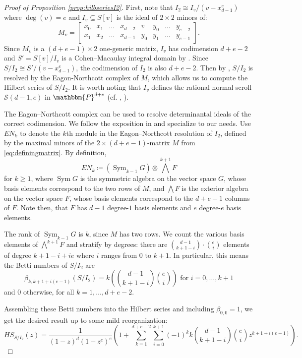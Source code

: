 \documentclass[12pt,reqno]{amsart}
\theoremstyle{definition}
\theoremstyle{remark}
\DeclareMathOperator{\Sym}{Sym}
\newcommand{\bbP}{\mathbbm{P}}
\newcommand{\calS}{{\mathcal{S}}}
\begin{document}
\begin{proof}[Proof of Proposition \ref{prop:hilbseriesI2}]
First, note that $I_2 \cong I_v/(v-x_{d-1}^e)$ where $\deg(v)=e$ and $I_v \subseteq S[v]$ is the ideal of $2 \times 2$ minors of:
$$
M_v = \begin{bmatrix}
x_0 & x_1 & \ldots & x_{d-2} & v & y_0 & \ldots & y_{e-2}\\
x_1 & x_2 & \ldots & x_{d-1} & y_0 & y_1 & \ldots & y_{e-1}
\end{bmatrix}.
$$
Since $M_v$ is a $(d+e-1) \times 2$ one-generic matrix, $I_v$ has codimension $d+e-2$ and $S' = S[v]/I_v$ is a Cohen--Macaulay integral domain by \cite[Theorem 6.4]{eGeomOSyz}.  Since $S/I_2 \cong S'/(v-x_{d-1}^e)$, the codimension of $I_2$ is also $d+e-2$.  Then by \cite[Theorem A2.60]{eGeomOSyz}, $S/I_2$ is resolved by the Eagon-Northcott complex of $M$, which allows us to compute the Hilbert series of $S/I_2$. It is worth noting that $I_v$ defines the rational normal scroll $\calS(d-1,e)$ in $\bbP^{d+e}$ (cf. \cite{ghPrinciplesAlgGeom}, \cite{ehVarietiesMinDeg}).

The Eagon--Northcott complex \cite{enIdDefBMatAACComplexAssocWThem} can be used to resolve determinantal ideals of the correct codimension. We follow the exposition in \cite[Appendix~A2H]{eGeomOSyz} and specialize to our needs. Use $EN_k$ to denote the $k$th module in the Eagon--Northcott resolution of $I_2$, defined by the maximal minors of the $2 \times (d+e-1)$-matrix $M$ from \eqref{eq:definingmatrix}. By definition, 
\[
EN_k \coloneqq (\Sym_{k-1} G) \otimes \textstyle{\bigwedge}^{k+1} F
\]
for $k \geq 1$, where $\Sym G$ is the symmetric algebra on the vector space $G$, whose basis elements correspond to the two rows of $M$, and $\textstyle{\bigwedge} F$ is the exterior algebra on the vector space $F$, whose basis elements correspond to the $d+e-1$ columns of $F$. Note then, that $F$ has $d-1$ degree-$1$ basis elements and $e$ degree-$e$ basis elements. 

The rank of $\Sym_{k-1}G$ is $k$, since $M$ has two rows. We count the various basis elements of $\textstyle{\bigwedge}^{k+1}F$ and stratify by degrees: there are $\binom{d-1}{k+1-i} \cdot \binom{e}{i}$ elements of degree $k+1-i + ie$ where $i$ ranges from $0$ to $k+1$. In particular, this means the Betti numbers of $S/I_2$ are
\[
\beta_{k,k+1+i(e-1)}(S/I_2) = k \left( \binom{d-1}{k+1-i} \binom{e}{i}\right) \text{ for } i = 0, \ldots, k+1
\]
and $0$ otherwise, for all $k=1, \ldots, d+e-2$. 

Assembling these Betti numbers into the Hilbert series and including $\beta_{0,0}=1$, we get the desired result up to some mild reorganization: 
\[
HS_{S/I_2}(z) = \frac{1}{(1-z)^d(1-z^e)^e} \left(1 + \sum\limits_{k=1}^{d+e-2} \sum\limits_{i=0}^{k+1} (-1)^k k \binom{d-1}{k+1-i} \binom{e}{i} z^{k+1+i(e-1)}\right).
\]

\end{proof}
\end{document}
